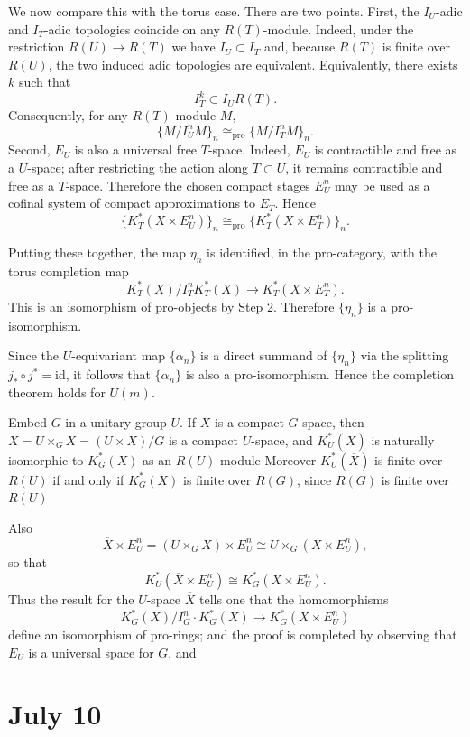 \documentclass[12pt]{article}
\begin{document}
We now compare this with the torus case. There are two points. First, the $I_U$-adic and $I_T$-adic topologies coincide on any
$R(T)$-module. Indeed, under the restriction $R(U)\longrightarrow R(T)$
we have $I_U\subset I_T$ and, because $R(T)$ is finite over $R(U)$, the two induced adic topologies are
equivalent. Equivalently, there exists $k$ such that
\[
    I_T^k\subset I_UR(T).
\]
Consequently, for any $R(T)$-module $M$,
\[
    \{M/I_U^nM\}_n
    \cong_{\mathrm{pro}}
    \{M/I_T^nM\}_n.
\]
Second, $E_U$ is also a universal free $T$-space. Indeed, $E_U$ is
contractible and free as a $U$-space; after restricting the action along
$T\subset U$, it remains contractible and free as a $T$-space. Therefore the
chosen compact stages $E_U^n$ may be used as a cofinal system of compact
approximations to $E_T$. Hence
\[
    \{K_T^*(X\times E_U^n)\}_n
    \cong_{\mathrm{pro}}
    \{K_T^*(X\times E_T^n)\}_n.
\]

Putting these together, the map $\eta_n$ is identified, in the pro-category,
with the torus completion map
\[
    K_T^*(X)/I_T^nK_T^*(X)
    \longrightarrow
    K_T^*(X\times E_T^n).
\]
This is an isomorphism of pro-objects by Step 2. Therefore $\{\eta_n\}$ is a
pro-isomorphism.

Since the $U$-equivariant map $\{\alpha_n\}$ is a direct summand of
$\{\eta_n\}$ via the splitting $j_*\circ j^*=\mathrm{id}$, it follows that
$\{\alpha_n\}$ is also a pro-isomorphism. Hence the completion theorem holds
for $U(m)$.

 Embed $G$ in a unitary group $U$. If $X$ is a compact
$G$-space, then $\overline X = U\times_G X = (U\times X)/G$ is a compact $U$-space,
and $K_U^*(\overline X)$ is naturally isomorphic to $K_G^*(X)$ as an $R(U)$-module
Moreover $K_U^*(\overline X)$ is finite over $R(U)$ if and
only if $K_G^*(X)$ is finite over $R(G)$, since $R(G)$ is finite over $R(U)$

Also
\[
\overline X\times E_U^n = (U\times_G X)\times E_U^n \cong U\times_G (X\times E_U^n),
\]
so that
\[
K_U^*(\overline X\times E_U^n)\cong K_G^*(X\times E_U^n).
\]
Thus the result for the $U$-space $\overline X$ tells one that the homomorphisms
\[
K_G^*(X)/I_G^n\cdot K_G^*(X)\longrightarrow K_G^*(X\times E_U^n)
\]
define an isomorphism of pro-rings; and the proof is completed by observing that
$E_U$ is a universal space for $G$, and 
\section{July 10}
\end{document}
